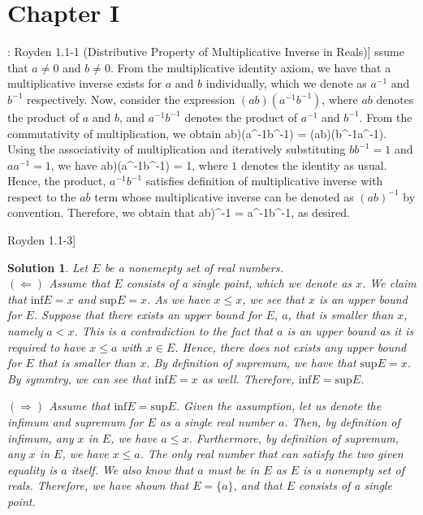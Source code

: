 \documentclass{article} %
\def\eQb#1\eQe{\begin{eqnarray*}#1\end{eqnarray*}}
\def\Qb#1\Qe{\begin{question}#1\end{question}}
\def\Sb#1\Se{\begin{solution}#1\end{solution}}
\theoremstyle{quest}
\newtheorem*{question}{Question}
\newtheorem*{solution}{Solution}
\begin{document}
\section{Chapter I}

\Qb[: Royden 1.1-1 (Distributive Property of Multiplicative Inverse in Reals)]
\Qe
\Sb
Assume that $a \neq 0$ and $b \neq 0$. From the multiplicative identity axiom,
we have that a multiplicative inverse exists for $a$ and $b$ individually, which we denote as
$a^{-1}$ and $b^{-1}$ respectively.
Now, consider the expression $(ab)(a^{-1}b^{-1})$, where $ab$ denotes the 
product of $a$ and $b$, and $a^{-1}b^{-1}$ denotes the product of $a^{-1}$ and $b^{-1}$.
From the commutativity of multiplication,
we obtain
\eQb
(ab)(a^{-1}b^{-1}) = (ab)(b^{-1}a^{-1}).
\eQe
Using the associativity of multiplication and iteratively substituting $bb^{-1} = 1$ and $aa^{-1} = 1$,
we have
\eQb
(ab)(a^{-1}b^{-1}) = 1,
\eQe
where $1$ denotes the identity as usual. Hence, the product, $a^{-1}b^{-1}$ satisfies definition
of multiplicative inverse with respect to the $ab$ term whose multiplicative inverse can be denoted
as $(ab)^{-1}$ by convention. Therefore, we obtain that
\eQb
(ab)^{-1} = a^{-1}b^{-1},
\eQe
as desired.
\Se

\bigskip

\Qb[Royden 1.1-3]
\Qe
\begin{solution}
Let $E$ be a nonemepty set of real numbers.\\ 
$\mathbf{( \Leftarrow )}$ Assume that 
$E$ consists of a single point, which we denote as $x$. We claim that
$\text{inf}E = x$ and $\text{sup}E = x$. As we have $x \leq x$, we see that $x$ is an upper bound
for $E$. Suppose that there exists an upper bound for $E$, $a$, that is smaller than $x$, namely 
$a < x$. This is a contradiction to the fact that $a$ is an upper bound as it is required to have
$x \leq a$ with $x \in E$. Hence, there does not exists any upper bound for $E$ that is smaller than
$x$. By definition of supremum, we have that $\text{sup}E = x$. By symmtry, we can see that
$\text{inf}E = x$ as well. Therefore, $\text{inf}E = \text{sup}E$. \\ 

\smallskip

$\mathbf{( \Rightarrow )}$ Assume that $\text{inf} E = \text{sup} E$. 
Given the assumption, let us denote the infimum and supremum for $E$ as a
single real number $a$. Then, by definition of infimum, any $x$ in $E$, we have
$a \leq x$. Furthermore, by definition of supremum, any $x$ in $E$, we have $x \leq a$.
The only real number that can satisfy the two given equality is $a$ itself. We also know
that $a$ must be in $E$ as $E$ is a nonempty set of reals. Therefore, 
we have shown that $E = \{ a \}$, and that $E$ consists of a single point.
\end{solution}
\end{document}

